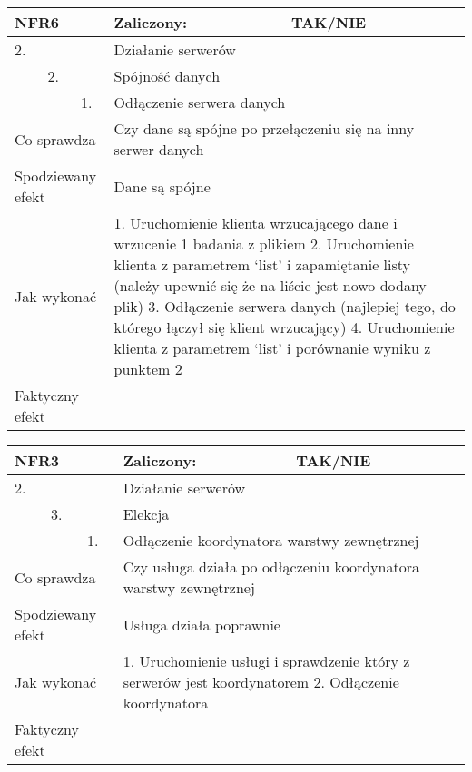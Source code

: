\begin{tabular}{|p{20pt}|p{20pt}|p{20pt}|p{250pt}|p{60pt}|}
	\hline
	\multicolumn{3}{|p{70pt}|}{NFR6} & Zaliczony: & TAK/NIE \\ \hline
	2. & & & \multicolumn{2}{|p{310pt}|}{Działanie serwerów } \\ \hline
	& 2. & & \multicolumn{2}{|p{310pt}|}{Spójność danych } \\ \hline
	& & 1. & \multicolumn{2}{|p{310pt}|}{Odłączenie serwera danych } \\ \hline
	\multicolumn{3}{|p{70pt}|}{Co sprawdza} & \multicolumn{2}{|p{310pt}|}{Czy dane są spójne po przełączeniu się na inny serwer danych} \\ \hline
	\multicolumn{3}{|p{70pt}|}{Spodziewany efekt} & \multicolumn{2}{|p{310pt}|}{Dane są spójne} \\ \hline
	\multicolumn{3}{|p{70pt}|}{Jak wykonać} & \multicolumn{2}{|p{310pt}|}{1. Uruchomienie klienta wrzucającego dane i wrzucenie 1 badania z plikiem
2. Uruchomienie klienta z parametrem ‘list’ i zapamiętanie listy (należy upewnić się że na liście jest nowo dodany plik)
3. Odłączenie serwera danych (najlepiej tego, do którego łączył się klient wrzucający)
4. Uruchomienie klienta z parametrem ‘list’ i porównanie wyniku z punktem 2} \\ \hline
	\multicolumn{3}{|p{70pt}|}{Faktyczny efekt} & \multicolumn{2}{|p{310pt}|}{} \\ \hline
\end{tabular}

\begin{tabular}{|p{20pt}|p{20pt}|p{20pt}|p{250pt}|p{60pt}|}
	\hline
	\multicolumn{3}{|p{70pt}|}{NFR3} & Zaliczony: & TAK/NIE \\ \hline
	2. & & & \multicolumn{2}{|p{310pt}|}{Działanie serwerów } \\ \hline
	& 3. & & \multicolumn{2}{|p{310pt}|}{Elekcja } \\ \hline
	& & 1. & \multicolumn{2}{|p{310pt}|}{Odłączenie koordynatora warstwy zewnętrznej } \\ \hline
	\multicolumn{3}{|p{70pt}|}{Co sprawdza} & \multicolumn{2}{|p{310pt}|}{Czy usługa działa po odłączeniu koordynatora warstwy zewnętrznej} \\ \hline
	\multicolumn{3}{|p{70pt}|}{Spodziewany efekt} & \multicolumn{2}{|p{310pt}|}{Usługa działa poprawnie} \\ \hline
	\multicolumn{3}{|p{70pt}|}{Jak wykonać} & \multicolumn{2}{|p{310pt}|}{1. Uruchomienie usługi i sprawdzenie który z serwerów jest koordynatorem
2. Odłączenie koordynatora} \\ \hline
	\multicolumn{3}{|p{70pt}|}{Faktyczny efekt} & \multicolumn{2}{|p{310pt}|}{} \\ \hline
\end{tabular}

